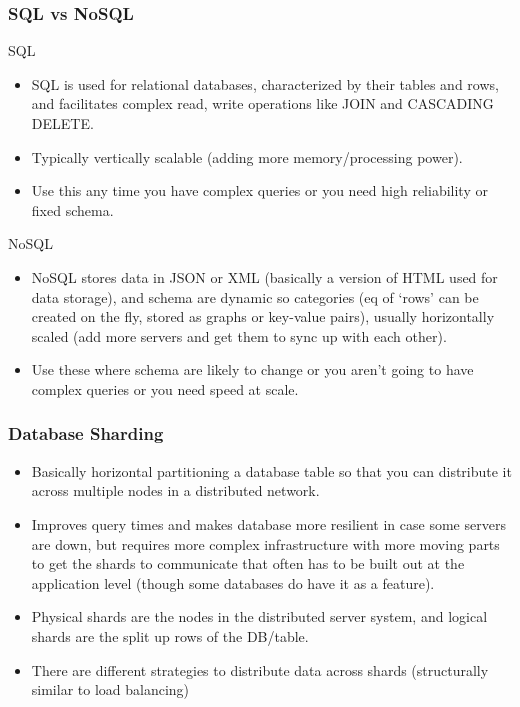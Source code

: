 \begin{frame}
	\frametitle{SQL vs NoSQL}
		SQL
			\begin{itemize}
				\item SQL is used for relational databases, characterized by their tables and rows, and facilitates 
complex read, write operations like JOIN and CASCADING DELETE. 
\item Typically vertically scalable (adding more memory/processing power). 
\item Use this any time you have complex queries or you 
need high reliability or fixed schema. 
			\end{itemize}
		NoSQL
			\begin{itemize}
				\item NoSQL stores data in JSON or XML (basically a version of HTML used for data storage), and 
schema are dynamic so categories (eq of ‘rows’ can be created on the fly, stored as graphs or 
key-value pairs), usually horizontally scaled (add more servers and get them to sync up with each 
other). 
\item Use these where schema are likely to change or you aren’t going to have complex queries 
or you need speed at scale. 
			\end{itemize}		
\end{frame}

\begin{frame}
	\frametitle{Database Sharding}
			\begin{itemize}
				\item Basically horizontal partitioning a database table so that you can distribute it across multiple nodes 
in a distributed network. 
				\item Improves query times and makes database more resilient in case some 
servers are down, but requires more complex infrastructure with more moving parts to get the 
shards to communicate that often has to be built out at the application level (though some 
databases do have it as a feature). 
				\item Physical shards are the nodes in the distributed server system, 
and logical shards are the split up rows of the DB/table. 
				\item There are different strategies to distribute 
data across shards (structurally similar to load balancing)
			\end{itemize}		
\end{frame}


